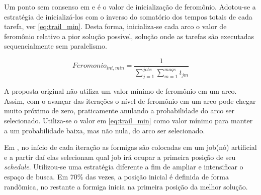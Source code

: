 Um ponto sem consenso em \cite{colorni1994ant} e \cite{Zwaan99antcolony} é o valor de inicialização de feromônio.
Adotou-se a estratégia de inicializá-los com o inverso do somatório dos tempos totais de cada tarefa, ver \eqref{eq:trail_min}.
Desta forma, inicializa-se cada arco o valor de feromônio relativo a pior solução possível, solução onde as tarefas são executadas
sequencialmente sem paralelismo.

\begin{equation} \label{eq:trail_min}
Feromonio_{ini,min} = \frac{1}{\sum_{j=1}^{jobs}\sum_{m=1}^{maqs}t_{jm}}
\end{equation}

A proposta original \cite{colorni1994ant} não utiliza um valor mínimo de feromônio em um arco. Assim, com o avançar das 
iterações o nível de feromônio em um arco pode chegar muito próximo de zero, praticamente anulando a probabilidade do arco 
ser selecionado. Utiliza-se o valor em \eqref{eq:trail_min} como valor mínimo para manter a um probabilidade baixa, mas não
nula, do arco ser selecionado.

Em \cite{colorni1994ant}, no início de cada iteração as formigas são colocadas em um job(nó) artificial e a partir daí elas 
selecionam qual job irá ocupar a primeira posição de seu \textit{schedule}. Utilizou-se uma estratégia diferente a fim de 
ampliar e intensificar o espaço de busca. Em 70\% das vezes, a posição inicial é definida de forma randômica, no restante 
a formiga inicia na primeira posição da melhor solução. 

